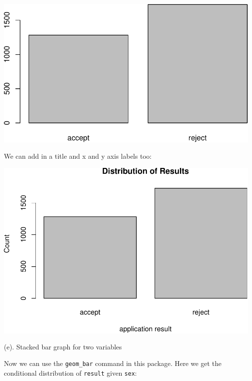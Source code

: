 \documentclass[
]{book}
\newenvironment{Shaded}{\begin{snugshade}}{\end{snugshade}}
\newcommand{\AttributeTok}[1]{\textcolor[rgb]{0.77,0.63,0.00}{#1}}
\newcommand{\FunctionTok}[1]{\textcolor[rgb]{0.00,0.00,0.00}{#1}}
\newcommand{\NormalTok}[1]{#1}
\newcommand{\SpecialCharTok}[1]{\textcolor[rgb]{0.00,0.00,0.00}{#1}}
\newcommand{\StringTok}[1]{\textcolor[rgb]{0.31,0.60,0.02}{#1}}
\begin{document}
\includegraphics[width=1\linewidth]{Class_Activity_4_files/figure-latex/unnamed-chunk-23-1}

We can add in a title and x and y axis labels too:

\begin{Shaded}
\end{Shaded}

\includegraphics[width=1\linewidth]{Class_Activity_4_files/figure-latex/unnamed-chunk-24-1}

(e). Stacked bar graph for two variables

Now we can use the \texttt{geom\_bar} command in this package. Here we get the conditional distribution of \texttt{result} given \texttt{sex}:
\end{document}
